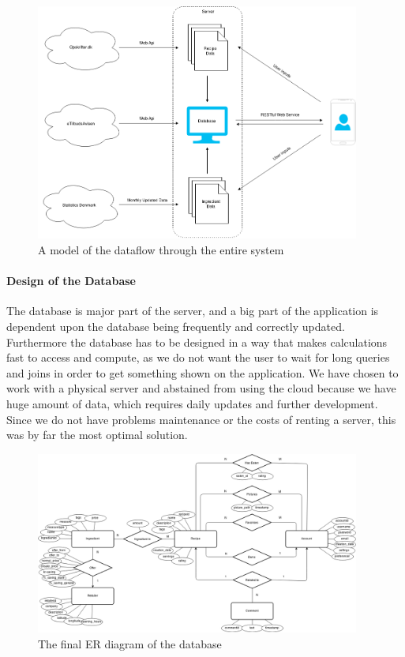 \begin{figure}
\label{fig:dataflow}
\centering
\includegraphics[width=0.95\textwidth]{Pictures/dataflow}
\caption{A model of the dataflow through the entire system}
\end{figure}

\paragraph{Design of the Database}
\label{para:dbdesign}

The database is major part of the server, and a big part of the application is dependent upon the database being frequently and correctly updated. Furthermore the database has to be designed in a way that makes calculations fast to access and compute, as we do not want the user to wait for long queries and joins in order to get something shown on the application. We have chosen to work with a physical server and abstained from using the cloud because we have huge amount of data, which requires daily updates and further development. Since we do not have problems maintenance or the costs of renting a server, this was by far the most optimal solution.

\begin{figure}
\label{fig:ER-diagram}
\centering
\includegraphics[width=0.95\textwidth]{Pictures/ERdiagram}
\caption{The final ER diagram of the database}
\end{figure}


